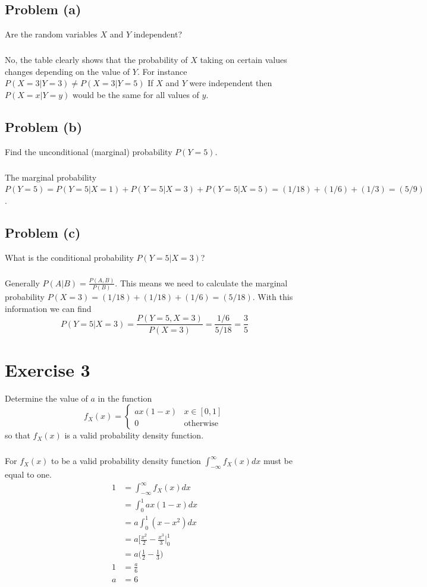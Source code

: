 \documentclass[11pt]{article}
\begin{document}
\subsection*{Problem (a)}
Are the random variables $X$ and $Y$ independent?

\subparagraph*{}
No, the table clearly shows that the probability of $X$ taking on certain values changes depending on the value of $Y$. For instance $P(X=3|Y=3)\neq P(X=3|Y=5)$ If $X$ and $Y$ were independent then $P(X=x|Y=y)$ would be the same for all values of $y$.

\subsection*{Problem (b)}
Find the unconditional (marginal) probability $P(Y=5)$.

\subparagraph*{}
The marginal probability $P(Y=5) = P(Y=5|X=1) + P(Y=5|X=3) + P(Y=5|X=5) = (1/18) + (1/6) + (1/3) = (5/9)$.

\subsection*{Problem (c)}
What is the conditional probability $P(Y=5|X=3)$?

\subparagraph*{}
Generally $P(A|B)=\frac{P(A,B)}{P(B)}$. This means we need to calculate the marginal probability $P(X=3)=(1/18)+(1/18)+(1/6)=(5/18)$. With this information we can find
\begin{equation*}
	P(Y=5|X=3)=\frac{P(Y=5,X=3)}{P(X=3)}=\frac{1/6}{5/18}=\frac{3}{5}
\end{equation*}

\section*{Exercise 3}
Determine the value of $a$ in the function 
\begin{equation*}
	f_X(x) = \begin{cases}
			 	ax(1-x) & x\in[0,1] \\
			 	0 & \text{otherwise}
			 \end{cases}
\end{equation*}
so that $f_X(x)$ is a valid probability density function.

\subparagraph*{}
For $f_X(x)$ to be a valid probability density function $\int_{-\infty}^{\infty}f_X(x)dx$ must be equal to one.
\begin{align*}
	1 &= \int_{-\infty}^{\infty}f_X(x)dx \\ 
	&= \int_{0}^{1}ax(1-x)dx \\
	&= a\int_{0}^{1}(x-x^2)dx \\
	&= a\Big[\frac{x^2}{2} - \frac{x^3}{3}\Big|_0^1 \\
	&= a\Big(\frac{1}{2}-\frac{1}{3}\Big) \\
	1 &= \frac{a}{6} \\
	a &= 6
\end{align*}
\end{document}

